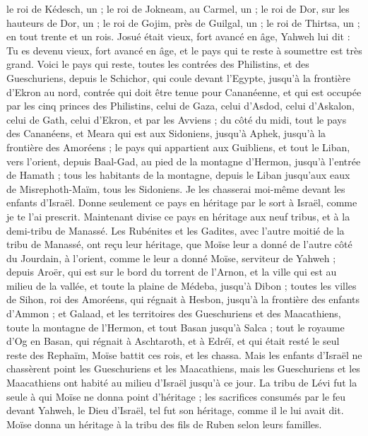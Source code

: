 \begin{multicols}{2}
le roi de Kédesch, un ; le roi de Jokneam, au Carmel, un ;
le roi de Dor, sur les hauteurs de Dor, un ; le roi de Gojim, près de Guilgal, un ;
le roi de Thirtsa, un ; en tout trente et un rois.
\VerseOne{}Josué était vieux, fort avancé en âge, Yahweh lui dit : Tu es devenu vieux, fort avancé en âge, et le pays qui te reste à soumettre est très grand.
Voici le pays qui reste, toutes les contrées des Philistins, et des Gueschuriens,
depuis le Schichor, qui coule devant l’Egypte, jusqu’à la frontière d’Ekron au nord, contrée qui doit être tenue pour Cananéenne, et qui est occupée par les cinq princes des Philistins, celui de Gaza, celui d’Asdod, celui d’Askalon, celui de Gath, celui d’Ekron, et par les Avviens ;
du côté du midi, tout le pays des Cananéens, et Meara qui est aux Sidoniens, jusqu’à Aphek, jusqu’à la frontière des Amoréens ;
le pays qui appartient aux Guibliens, et tout le Liban, vers l’orient, depuis Baal-Gad, au pied de la montagne d’Hermon, jusqu’à l’entrée de Hamath ;
tous les habitants de la montagne, depuis le Liban jusqu’aux eaux de Misrephoth-Maïm, tous les Sidoniens. Je les chasserai moi-même devant les enfants d’Israël. Donne seulement ce pays en héritage par le sort à Israël, comme je te l’ai prescrit.
Maintenant divise ce pays en héritage aux neuf tribus, et à la demi-tribu de Manassé.
Les Rubénites et les Gadites, avec l’autre moitié de la tribu de Manassé, ont reçu leur héritage, que Moïse leur a donné de l’autre côté du Jourdain, à l’orient, comme le leur a donné Moïse, serviteur de Yahweh ;
depuis Aroër, qui est sur le bord du torrent de l’Arnon, et la ville qui est au milieu de la vallée, et toute la plaine de Médeba, jusqu’à Dibon ;
toutes les villes de Sihon, roi des Amoréens, qui régnait à Hesbon, jusqu’à la frontière des enfants d’Ammon ;
et Galaad, et les territoires des Gueschuriens et des Maacathiens, toute la montagne de l’Hermon, et tout Basan jusqu’à Salca ;
tout le royaume d’Og en Basan, qui régnait à Aschtaroth, et à Edréï, et qui était resté le seul reste des Rephaïm, Moïse battit ces rois, et les chassa.
Mais les enfants d’Israël ne chassèrent point les Gueschuriens et les Maacathiens, mais les Gueschuriens et les Maacathiens ont habité au milieu d’Israël jusqu’à ce jour.
La tribu de Lévi fut la seule à qui Moïse ne donna point d’héritage ; les sacrifices consumés par le feu devant Yahweh, le Dieu d’Israël, tel fut son héritage, comme il le lui avait dit.
Moïse donna un héritage à la tribu des fils de Ruben selon leurs familles.

\end{multicols}

